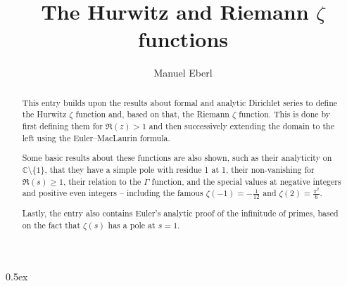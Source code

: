 \documentclass[11pt,a4paper]{article}
\begin{document}
\title{The Hurwitz and Riemann $\zeta$ functions}
\author{Manuel Eberl}
\maketitle

\begin{abstract}
This entry builds upon the results about formal and analytic Dirichlet series to define the Hurwitz $\zeta$ function and,
based on that, the Riemann $\zeta$ function. This is done by first defining them for $\mathfrak{R}(z) > 1$ and then successively
extending the domain to the left using the Euler--MacLaurin formula.

Some basic results about these functions are also shown, such as their analyticity on $\mathbb{C}\setminus\{1\}$, that they have a simple pole with residue 1 at 1, their non-vanishing for $\mathfrak{R}(s)\geq 1$, their relation to the $\Gamma$ function, and the special values at negative integers and positive even integers -- including the famous $\zeta(-1) = -\frac{1}{12}$ and $\zeta(2) = \frac{\pi^2}{6}$.

Lastly, the entry also contains Euler's analytic proof of the infinitude of primes, based on the fact that $\zeta(s)$ has a pole at $s = 1$.
\end{abstract}

\tableofcontents
\newpage
\parindent 0pt\parskip 0.5ex





\end{document}

